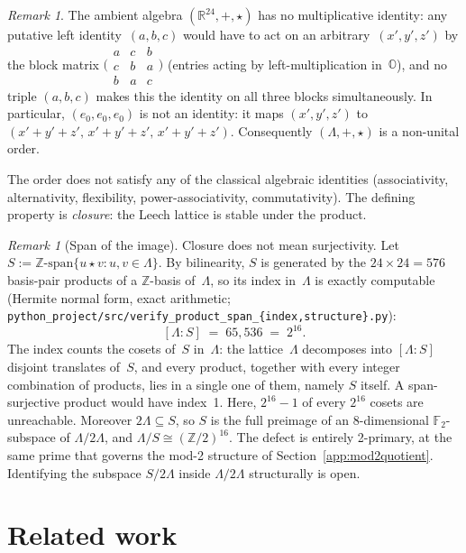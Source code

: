 \documentclass[twoside,english]{paper}
\numberwithin{equation}{section}
\numberwithin{figure}{section}
\theoremstyle{definition}
\theoremstyle{remark}
\newtheorem{remark}[theorem]{Remark}
\newcommand{\OO}{\mathbb{O}}          %
\newcommand{\RR}{\mathbb{R}}
\newcommand{\ZZ}{\mathbb{Z}}
\newcommand{\FF}{\mathbb{F}}
\newcommand{\LL}{\Lambda}             %
\begin{document}
\begin{remark}
The ambient algebra $(\RR^{24}, +, \star)$ has no multiplicative
identity: any putative left identity~$(a,b,c)$ would have to act on
an arbitrary~$(x',y',z')$ by the block matrix
$\bigl(\begin{smallmatrix} a & c & b \\ c & b & a \\ b & a & c
\end{smallmatrix}\bigr)$ (entries acting by left-multiplication
in~$\OO$), and no triple $(a,b,c)$ makes this the identity on all
three blocks simultaneously.  In particular, $(e_0, e_0, e_0)$ is
not an identity: it maps $(x', y', z')$ to $(x'+y'+z',\, x'+y'+z',\,
x'+y'+z')$.  Consequently $(\LL, +, \star)$ is a non-unital order.
\end{remark}

The order does not satisfy any of the classical algebraic identities
(associativity, alternativity, flexibility, power-associativity,
commutativity).  The defining property is \emph{closure}: the Leech
lattice is stable under the product.

\begin{remark}[Span of the image]\label{rem:span-defect}
Closure does not mean surjectivity.  Let $S :=
\ZZ\text{-span}\{u \star v : u, v \in \LL\}$.  By bilinearity, $S$ is
generated by the $24 \times 24 = 576$ basis-pair products of a
$\ZZ$-basis of~$\LL$, so its index in~$\LL$ is exactly computable
(Hermite normal form, exact arithmetic;
\texttt{python\_project/src/verify\_product\_span\_\{index,structure\}.py}):
\[
  [\LL : S] \;=\; 65{,}536 \;=\; 2^{16}.
\]
The index counts the cosets of~$S$ in~$\LL$: the lattice~$\LL$
decomposes into $[\LL : S]$ disjoint translates of~$S$, and every
product, together with every integer combination of products, lies
in a single one of them, namely $S$ itself.  A span-surjective
product would have index~1.  Here, $2^{16} - 1$ of every $2^{16}$
cosets are unreachable.  Moreover $2\LL \subseteq S$, so $S$ is the
full preimage of an 8-dimensional $\FF_2$-subspace of $\LL/2\LL$,
and $\LL/S \cong (\ZZ/2)^{16}$.  The defect is entirely 2-primary,
at the same prime that governs the mod-2 structure of
Section~\ref{app:mod2quotient}.  Identifying the subspace $S/2\LL$
inside $\LL/2\LL$ structurally is open.
\end{remark}

\section{Related work}\label{sec:related}
\end{document}

